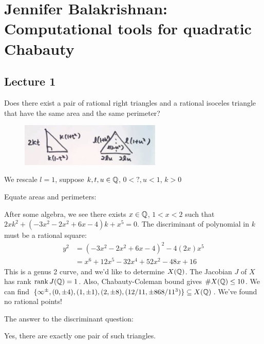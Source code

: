 \newpage
\section{Jennifer Balakrishnan: Computational tools for quadratic Chabauty}
\subsection{Lecture 1}

\begin{ques}
Does there exist a pair of rational right triangles and a rational isoceles triangle that have the same area and the same perimeter?
\end{ques}

	\begin{figure}[!ht]
	\centering
	\includegraphics[width=0.6\textwidth]{../images/im4.png}
	\end{figure}

We rescale $l=1$, suppose $k,t,u \in \mathbb{Q}$, $0<?,u<1$, $k>0$

Equate areas and perimeters:


After some algebra, we see there exists $x \in \mathbb{Q}$, $1<x<2$ such that $2xk^2+(-3x^2-2x^2+6x-4)k+x^5= 0$. The discriminant of polynomial in $k$ must be a rational square:
	\[
	\begin{aligned}
	y^2&= (-3x^2-2x^2+6x-4)^2-4(2x)x^5 \\
	&=x^6+12x^5-32x^4+52x^2-48x+16
	\end{aligned}
	\]
This is a genus 2 curve, and we'd like to determine $X(\mathbb{Q})$. The Jacobian $J$ of $X$ has rank $\operatorname{rank} J(\mathbb{Q})=1$. Also, Chabauty-Coleman bound gives $\#X(\mathbb{Q}) \leq 10$. We can find $\{\infty^\pm, (0,\pm 4), (1,\pm 1), (2, \pm 8), (12/11,\pm 868/11^3) \} \subseteq X(\mathbb{Q})$. We've found no rational points!


The answer to the discriminant question:


\begin{thm}
Yes, there are exactly one pair of such triangles.
\end{thm}



